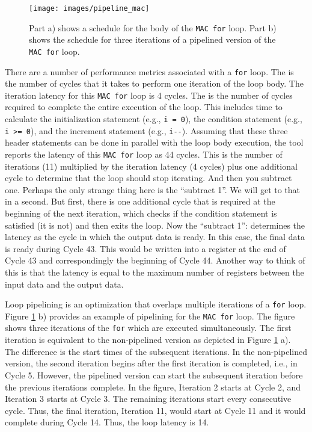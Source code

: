 \begin{figure}
\centering
\texttt{[image: images/pipeline\_mac]}
\caption{Part a) shows a schedule for the body of the \lstinline{MAC for} loop. Part b) shows the schedule for three iterations of a pipelined version of the \lstinline{MAC for} loop.}
\label{fig:pipeline_mac}
\end{figure}

There are a number of performance metrics associated with a \lstinline{for} loop. The  is the number of cycles that it takes to perform one iteration of the loop body. The iteration latency for this \lstinline{MAC for} loop is 4 cycles. The  is the number of cycles required to complete the entire execution of the loop. This includes time to calculate the initialization statement (e.g., \lstinline{i = 0}), the condition statement (e.g., \lstinline{i >= 0}), and the increment statement (e.g., \lstinline{i--}). Assuming that these three header statements can be done in parallel with the loop body execution, the \VHLS tool reports the latency of this \lstinline{MAC for} loop as 44 cycles. This is the  number of iterations (11) multiplied by the iteration latency (4 cycles) plus one additional cycle to determine that the loop should stop iterating. And then you subtract one. Perhaps the only strange thing here is the ``subtract 1''. We will get to that in a second. But first, there is one additional cycle that is required at the beginning of the next iteration, which checks if the condition statement is satisfied (it is not) and then exits the loop. Now the ``subtract 1'': \VHLS determines the latency as the cycle in which the output data is ready. In this case, the final data is ready during Cycle 43. This would be written into a register at the end of Cycle 43 and correspondingly the beginning of Cycle 44.   Another way to think of this is that the latency is equal to the maximum number of registers between the input data and the output data. 

Loop pipelining is an optimization that overlaps multiple iterations of a \lstinline{for} loop. Figure \ref{fig:pipeline_mac} b) provides an example of pipelining for the \lstinline{MAC for} loop. The figure shows three iterations of the \lstinline{for} which are executed simultaneously. The first iteration is equivalent to the non-pipelined version as depicted in Figure \ref{fig:pipeline_mac} a). The difference is the start times of the subsequent iterations. In the non-pipelined version, the second iteration begins after the first iteration is completed, i.e., in Cycle 5. However, the pipelined version can start the subsequent iteration before the previous iterations complete. In the figure, Iteration 2 starts at Cycle 2, and Iteration 3 starts at Cycle 3. The remaining iterations start every consecutive cycle. Thus, the final iteration, Iteration 11, would start at Cycle 11 and it would complete during Cycle 14. Thus, the loop latency is 14.

